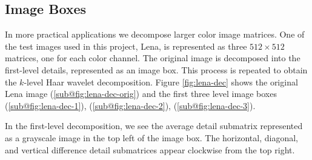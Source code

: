 \documentclass[12pt]{article}
\theoremstyle{definition}
\begin{document}

  \subsection{Image Boxes}

  In more practical applications we decompose larger color image matrices. One of the test images used in this project, Lena, is represented as three \(512 \times 512\) matrices, one for each color channel. The original image is decomposed into the first-level details, represented as an image box. This process is repeated to obtain the \(k\)-level Haar wavelet decomposition. Figure \ref{fig:lena-dec} shows the original Lena image (\ref{sub@fig:lena-dec-orig}) and the first three level image boxes (\ref{sub@fig:lena-dec-1}), (\ref{sub@fig:lena-dec-2}), (\ref{sub@fig:lena-dec-3}).
  
  In the first-level decomposition, we see the average detail submatrix represented as a grayscale image in the top left of the image box. The horizontal, diagonal, and vertical difference detail submatrices appear clockwise from the top right.
\end{document}
